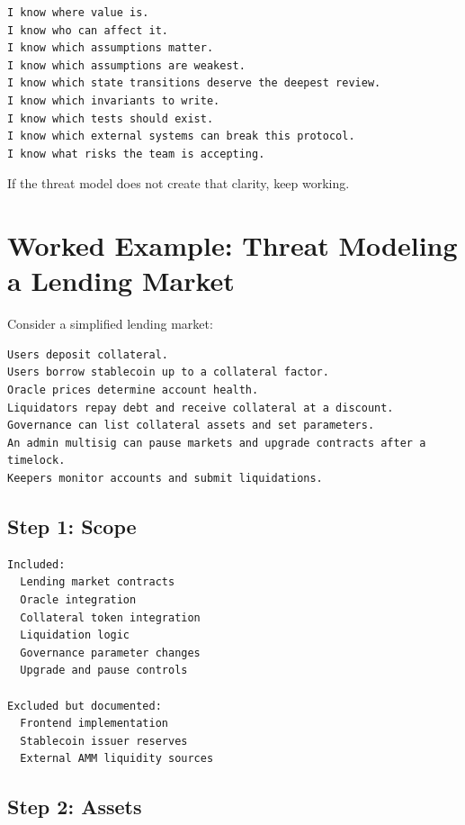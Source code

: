 \begin{lstlisting}
I know where value is.
I know who can affect it.
I know which assumptions matter.
I know which assumptions are weakest.
I know which state transitions deserve the deepest review.
I know which invariants to write.
I know which tests should exist.
I know which external systems can break this protocol.
I know what risks the team is accepting.
\end{lstlisting}

If the threat model does not create that clarity, keep working.

\section{Worked Example: Threat Modeling a Lending Market}

Consider a simplified lending market:

\begin{lstlisting}
Users deposit collateral.
Users borrow stablecoin up to a collateral factor.
Oracle prices determine account health.
Liquidators repay debt and receive collateral at a discount.
Governance can list collateral assets and set parameters.
An admin multisig can pause markets and upgrade contracts after a timelock.
Keepers monitor accounts and submit liquidations.
\end{lstlisting}

\subsection{Step 1: Scope}

\begin{lstlisting}
Included:
  Lending market contracts
  Oracle integration
  Collateral token integration
  Liquidation logic
  Governance parameter changes
  Upgrade and pause controls

Excluded but documented:
  Frontend implementation
  Stablecoin issuer reserves
  External AMM liquidity sources
\end{lstlisting}

\subsection{Step 2: Assets}

